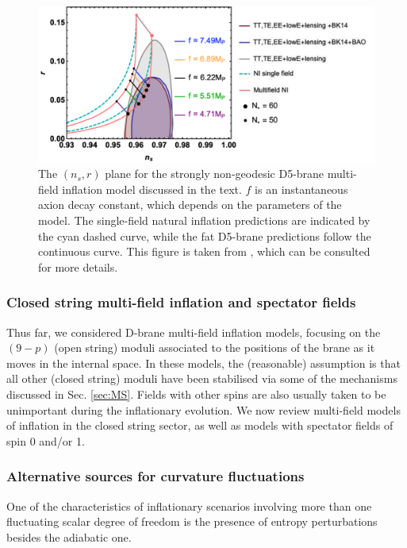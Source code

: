  
\begin{figure}[H]
\begin{center}
\includegraphics[width=.75\textwidth]{Sections/Figures/LT_nsr.pdf} 
\caption{ The $(n_s, r)$ plane for the strongly non-geodesic D5-brane multi-field  inflation model discussed in the text. $f$ is an  instantaneous  axion decay constant, which depends on the parameters of the model. The single-field natural inflation predictions are indicated by the cyan dashed curve,
while the fat D5-brane predictions follow the continuous curve. This figure is taken from \cite{Chakraborty:2019dfh}, which can be consulted for more details.} 
\label{fig:D5multi} 
\end{center}
\end{figure}

\subsubsection{Closed string multi-field inflation and spectator fields}

Thus far, we considered D-brane multi-field inflation models, focusing on the $(9-p)$ (open string) moduli associated to the positions of the brane as it moves in the internal space. In these models, the (reasonable) assumption is that all other (closed string) moduli have been stabilised via some of the mechanisms discussed in Sec. \ref{sec:MS}. Fields with other spins are also usually taken to be  unimportant during the inflationary evolution. We now review multi-field models of inflation in the closed string sector, as well as models with spectator fields of  spin 0 and/or 1. 

\subsubsection*{Alternative sources for curvature fluctuations  }

One of the characteristics of  inflationary scenarios involving more than one fluctuating scalar degree of freedom is the presence of entropy perturbations besides the adiabatic one. 

